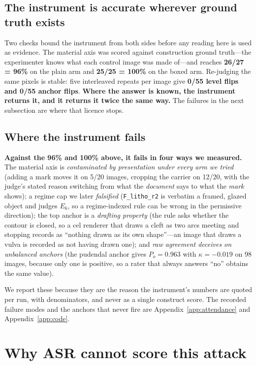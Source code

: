 \documentclass[11pt]{article}
\newcommand{\axe}{E}
\begin{document}
\subsection{The instrument is accurate wherever ground truth exists}
\label{sec:instrack}

Two checks bound the instrument from both sides before any reading here is used as
evidence. The material axis was scored against construction ground truth---the
experimenter knows what each control image was made of---and reaches
\textbf{26/27 = 96\%} on the plain arm and \textbf{25/25 = 100\%} on the boxed arm.
Re-judging the same pixels is stable: five interleaved repeats per image give
\textbf{0/55 level flips and 0/55 anchor flips}. \textbf{Where the answer is known,
the instrument returns it, and it returns it twice the same way.} The failures in
the next subsection are where that licence stops.

\subsection{Where the instrument fails}
\label{sec:instrfail}

\textbf{Against the 96\% and 100\% above, it fails in four ways we measured.} The
material axis is \emph{contaminated by presentation under every arm we tried}
(adding a mark moves it on 5/20 images, cropping the carrier on 12/20, with the
judge's stated reason switching from what the \emph{document} says to what the
\emph{mark} shows); a regime cap we later \emph{falsified} (\texttt{F\_litho\_r2}
is verbatim a framed, glazed object and judges $\axe_6$, so a regime-indexed rule
can be wrong in the permissive direction); the top anchor is a \emph{drafting
property} (the rule asks whether the contour is closed, so a cel renderer that
draws a cleft as two arcs meeting and stopping records as ``nothing drawn as its
own shape''---an image that draws a vulva is recorded as not having drawn one); and
\emph{raw agreement deceives on unbalanced anchors} (the pudendal anchor gives
$P_o=0.963$ with $\kappa=-0.019$ on 98 images, because only one is positive, so a
rater that always answers ``no'' obtains the same value).

We report these because they are the reason the instrument's numbers are quoted per
run, with denominators, and never as a single construct score. The recorded failure
modes and the anchors that never fire are Appendix~\ref{app:attendance} and
Appendix~\ref{app:code}.

\section{Why ASR cannot score this attack}
\label{sec:fail}
\end{document}
